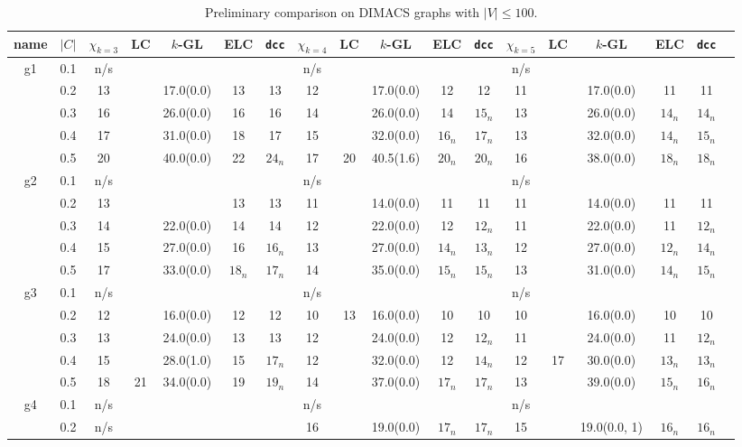 \documentclass[10pt]{article}
\begin{document}
\begin{table}[H]
  \small
  \centering
    \caption{Preliminary comparison on DIMACS graphs with $|V| \leq 100 $. }
  \begin{tabular}{|c|c|c|c|c|c|c||c|c|c|c|c||c|c|c|c|c|c|} \hline
	name &$|C|$&$\chi _{k=3}$& LC & $k$-GL & ELC& \texttt{dcc} & $\chi_{k = 4}$ & LC & $k$-GL & ELC & \texttt{dcc} & $\chi_{k=5}$&LC&$k$-GL&ELC&\texttt{dcc}\\ 
	\hline
	g1&0.1&n/s&  & & & &n/s&  &  &  &  & n/s&&&&\\ 
	\hline
	&0.2&13&  & 17.0(0.0) & 13& 13 &12 &  &17.0(0.0) & 12 & 12 & 11&&17.0(0.0)&11&11\\ 
	\hline
	&0.3&16& & 26.0(0.0) & 16& 16 &14 &  &26.0(0.0)& 14 & $15_n$ & 13&&26.0(0.0)&$14_n$&$14_n$\\ 
	\hline
	&0.4&17&  & 31.0(0.0) & 18& 17 & 15 &  & 32.0(0.0) & $16_n$ & $17_n$ & 13&&32.0(0.0)&$14_n$&$15_n$\\ 
	\hline
	&0.5&20&  & 40.0(0.0) & 22& $24_n$ & 17&20  & 40.5(1.6) & $20_n$ & $20_n$ & 16&&38.0(0.0)&$18_n$&$18_n$\\ 
	\hline
	g2&0.1&n/s&  & & & &n/s&  &  &  &  & n/s&&&&\\ 
	\hline
	&0.2&13&  & & 13& 13 &11 &  &14.0(0.0) & 11 & 11 & 11&&14.0(0.0)&11&11\\ 
	\hline
	&0.3&14& & 22.0(0.0) & 14& 14 &12 &  &22.0(0.0)& 12 & $12_n$ & 11&&22.0(0.0)&11&$12_n$\\ 
	\hline
	&0.4&15&  & 27.0(0.0) & 16& $16_n$ & 13 &  & 27.0(0.0) & $14_n$ & $13_n$ & 12&&27.0(0.0)&$12_n$&$14_n$\\ 
	\hline
	&0.5&17&  & 33.0(0.0) & $18_n$& $17_n$ & 14&  & 35.0(0.0) & $15_n$ & $15_n$ & 13&&31.0(0.0)&$14_n$&$15_n$\\ 
	\hline
	g3&0.1&n/s&  & & & &n/s&  &  &  &  & n/s&&&&\\ 
	\hline
	&0.2&12&  & 16.0(0.0)& 12& 12 &10 & 13 &16.0(0.0) & 10 & 10 & 10&&16.0(0.0)&10&10\\ 
	\hline
	&0.3&13& & 24.0(0.0) & 13& 13 &12 &  &24.0(0.0)& 12 & $12_n$ & 11&&24.0(0.0)&11&$12_n$\\ 
	\hline
	&0.4&15&  & 28.0(1.0) & 15& $17_n$ & 12 &  & 32.0(0.0) &12 & $14_n$ & 12&17&30.0(0.0)&$13_n$&$13_n$\\ 
	\hline
	&0.5&18& 21 & 34.0(0.0) & 19& $19_n$ & 14&  & 37.0(0.0) & $17_n$ & $17_n$ & 13&&39.0(0.0)&$15_n$&$16_n$\\ 
	\hline
	g4&0.1&n/s&  & & & &n/s&  &  &  &  & n/s&&&&\\ 
	\hline
	&0.2&n/s&  & & & &16 & &19.0(0.0) & $17_n$ & $17_n$ & 15&&19.0(0.0, 1\footnotemark)&$16_n$&$16_n$\\ 

\end{tabular}
\end{table}
\end{document}
